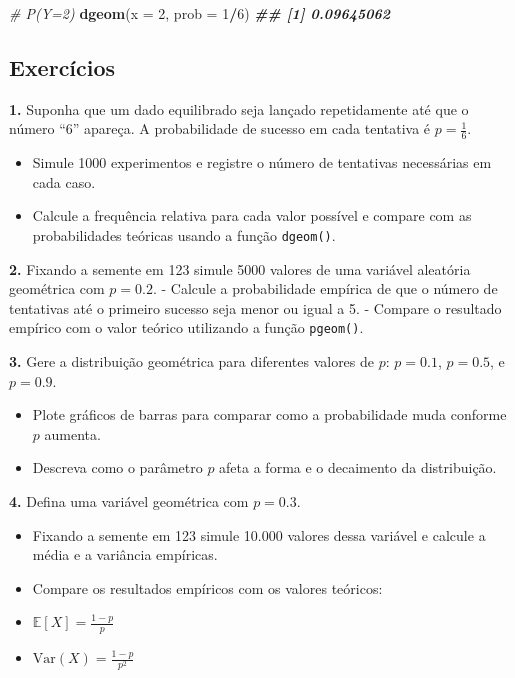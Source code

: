 \documentclass[
]{book}
\newenvironment{Shaded}{\begin{snugshade}}{\end{snugshade}}
\newcommand{\AttributeTok}[1]{\textcolor[rgb]{0.13,0.29,0.53}{#1}}
\newcommand{\CommentTok}[1]{\textcolor[rgb]{0.56,0.35,0.01}{\textit{#1}}}
\newcommand{\DecValTok}[1]{\textcolor[rgb]{0.00,0.00,0.81}{#1}}
\newcommand{\DocumentationTok}[1]{\textcolor[rgb]{0.56,0.35,0.01}{\textbf{\textit{#1}}}}
\newcommand{\FunctionTok}[1]{\textcolor[rgb]{0.13,0.29,0.53}{\textbf{#1}}}
\newcommand{\NormalTok}[1]{#1}
\newcommand{\SpecialCharTok}[1]{\textcolor[rgb]{0.81,0.36,0.00}{\textbf{#1}}}
\providecommand{\tightlist}{%
  \setlength{\itemsep}{0pt}\setlength{\parskip}{0pt}}
\begin{document}
\begin{Shaded}
\begin{Highlighting}[]
\CommentTok{\# P(Y=2)}
\FunctionTok{dgeom}\NormalTok{(}\AttributeTok{x =} \DecValTok{2}\NormalTok{, }\AttributeTok{prob =} \DecValTok{1}\SpecialCharTok{/}\DecValTok{6}\NormalTok{)}
\DocumentationTok{\#\# [1] 0.09645062}
\end{Highlighting}
\end{Shaded}

\subsection{Exercícios}\label{exercuxedcios-27}

\textbf{1.} Suponha que um dado equilibrado seja lançado repetidamente até que o número ``6'' apareça. A probabilidade de sucesso em cada tentativa é \(p = \frac{1}{6}\).

\begin{itemize}
\tightlist
\item
  Simule 1000 experimentos e registre o número de tentativas necessárias em cada caso.
\item
  Calcule a frequência relativa para cada valor possível e compare com as probabilidades teóricas usando a função \texttt{dgeom()}.
\end{itemize}

\textbf{2.} Fixando a semente em 123 simule 5000 valores de uma variável aleatória geométrica com \(p = 0.2\).
- Calcule a probabilidade empírica de que o número de tentativas até o primeiro sucesso seja menor ou igual a 5.
- Compare o resultado empírico com o valor teórico utilizando a função \texttt{pgeom()}.

\textbf{3.} Gere a distribuição geométrica para diferentes valores de \(p\): \(p= 0.1\), \(p = 0.5\), e \(p = 0.9\).

\begin{itemize}
\tightlist
\item
  Plote gráficos de barras para comparar como a probabilidade muda conforme \(p\) aumenta.
\item
  Descreva como o parâmetro \(p\) afeta a forma e o decaimento da distribuição.
\end{itemize}

\textbf{4.} Defina uma variável geométrica com \(p = 0.3\).

\begin{itemize}
\tightlist
\item
  Fixando a semente em 123 simule 10.000 valores dessa variável e calcule a média e a variância empíricas.
\item
  Compare os resultados empíricos com os valores teóricos:
\item
  \(\mathbb{E}[X] = \frac{1-p}{p}\)
\item
  \(\text{Var}(X) = \frac{1-p}{p^2}\)
\end{itemize}
\end{document}
